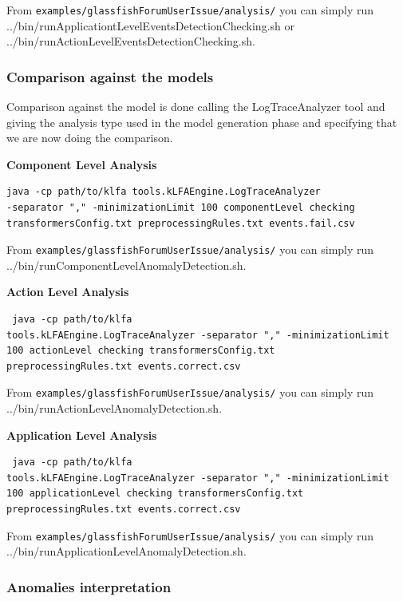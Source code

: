 From \texttt{examples/glassfishForumUserIssue/analysis/} you can simply run
../bin/runApplicationtLevelEventsDetectionChecking.sh or
../bin/runActionLevelEventsDetectionChecking.sh.

\subsubsection{Comparison against the models}

Comparison against the model is done calling the LogTraceAnalyzer
tool and giving the analysis type used in the model generation phase
and specifying that we are now doing the comparison.

\textbf{Component Level Analysis}

\begin{verbatim}
java -cp path/to/klfa tools.kLFAEngine.LogTraceAnalyzer
-separator "," -minimizationLimit 100 componentLevel checking
transformersConfig.txt preprocessingRules.txt events.fail.csv
\end{verbatim}

From \texttt{examples/glassfishForumUserIssue/analysis/} you can simply run
../bin/runComponentLevelAnomalyDetection.sh.

\textbf{Action Level Analysis}

\begin{verbatim}
 java -cp path/to/klfa
tools.kLFAEngine.LogTraceAnalyzer -separator "," -minimizationLimit
100 actionLevel checking transformersConfig.txt
preprocessingRules.txt events.correct.csv
\end{verbatim}

From \texttt{examples/glassfishForumUserIssue/analysis/} you can simply run
../bin/runActionLevelAnomalyDetection.sh.

\textbf{Application Level Analysis}

\begin{verbatim}
 java -cp path/to/klfa
tools.kLFAEngine.LogTraceAnalyzer -separator "," -minimizationLimit
100 applicationLevel checking transformersConfig.txt
preprocessingRules.txt events.correct.csv
\end{verbatim}

From \texttt{examples/glassfishForumUserIssue/analysis/} you can simply run
../bin/runApplicationLevelAnomalyDetection.sh.

\subsubsection{Anomalies interpretation}

